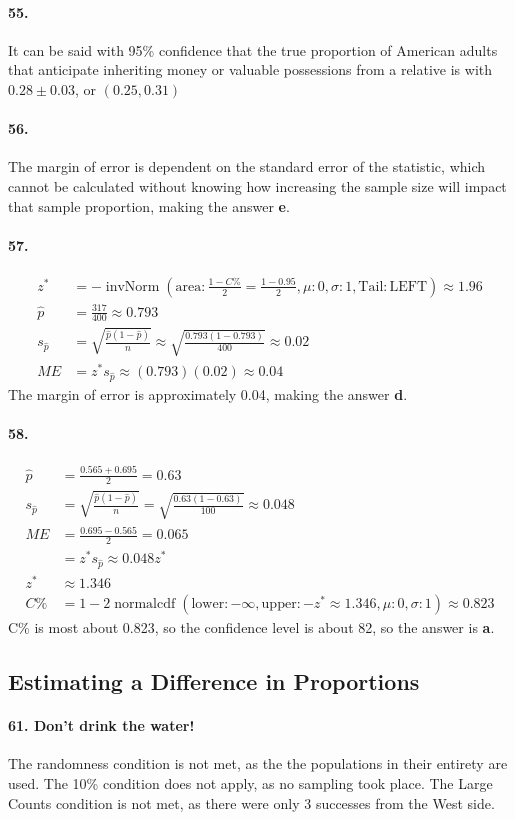 \documentclass[12pt, A4]{article}
\DeclareMathOperator{\invNorm}{invNorm}
\DeclareMathOperator{\normalcdf}{normalcdf}
\newcommand{\invNormal}[4]{\invNorm\left(\mathrm{area}:#1, \mu: #2, \sigma: #3, \mathrm{Tail: #4}\right)}
\newcommand{\normalCDF}[4]{\normalcdf\left(\mathrm{lower}: #1, \mathrm{upper}: #2, \mu: #3, \sigma: #4\right)}
\newcommand{\propse}[2]{\sqrt{\frac{#1\left(1 - #1\right)}{#2}}}
\begin{document}
		\paragraph{55.}
			It can be said with 95\% confidence that the true proportion of American adults that anticipate inheriting money or valuable possessions from a relative is with $0.28 \pm 0.03$, or $(0.25, 0.31)$
		\paragraph{56.}
			The margin of error is dependent on the standard error of the statistic, which cannot be calculated without knowing how increasing the sample size will impact that sample proportion, making the answer \textbf{e}.
		\paragraph{57.}
			\begin{align*}
				z^* &= -\invNormal{\frac{1 - C\%}{2} = \frac{1 - 0.95}{2}}{0}{1}{LEFT} \approx 1.96 \\
				\hat{p} &= \frac{317}{400} \approx 0.793 \\
				s_{\hat{p}} &= \propse{\hat{p}}{n} \approx \propse{0.793}{400} \approx 0.02  \\
				ME &= z^*s_{\hat{p}} \approx (0.793)(0.02) \approx 0.04
			\end{align*}
			The margin of error is approximately 0.04, making the answer \textbf{d}.
		\paragraph{58.}
			\begin{align*}
				\hat{p} &= \frac{0.565 + 0.695}{2} = 0.63 \\
				s_{\hat{p}} &= \sqrt{\frac{\hat{p}(1 - \hat{p})}{n}} = \sqrt{\frac{0.63(1 - 0.63)}{100}} \approx 0.048 \\
				ME &= \frac{0.695 - 0.565}{2} = 0.065 \\
					&= z^*s_{\hat{p}} \approx 0.048z^* \\
				z^* &\approx 1.346 \\
				C\% &= 1 - 2\normalCDF{-\infty}{-z^* \approx 1.346}{0}{1} \approx 0.823
			\end{align*}
			C\% is most about 0.823, so the confidence level is about 82, so the answer is \textbf{a}.
	\subsection{Estimating a Difference in Proportions}
		\paragraph{61. Don't drink the water!}
			The randomness condition is not met, as the the populations in their entirety are used.
			The 10\% condition does not apply, as no sampling took place.
			The Large Counts condition is not met, as there were only 3 successes from the West side.
\end{document}
